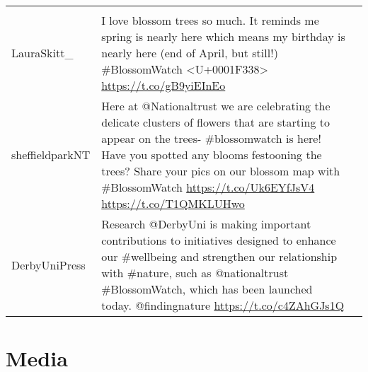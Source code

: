 \documentclass[
]{article}
\begin{document}
\begin{longtable}[]{@{}llr@{}}
\begin{minipage}[t]{0.42\columnwidth}
\end{minipage} & \begin{minipage}[t]{0.18\columnwidth}\raggedleft
2\strut
\end{minipage}\tabularnewline
\begin{minipage}[t]{0.23\columnwidth}\raggedright
LauraSkitt\_\strut
\end{minipage} & \begin{minipage}[t]{0.42\columnwidth}\raggedright
I love blossom trees so much. It reminds me spring is nearly here which
means my birthday is nearly here (end of April, but still!)
\#BlossomWatch \textless U+0001F338\textgreater{}
\url{https://t.co/gB9yiEInEo}\strut
\end{minipage} & \begin{minipage}[t]{0.18\columnwidth}\raggedleft
2\strut
\end{minipage}\tabularnewline
\begin{minipage}[t]{0.23\columnwidth}\raggedright
sheffieldparkNT\strut
\end{minipage} & \begin{minipage}[t]{0.42\columnwidth}\raggedright
Here at @Nationaltrust we are celebrating the delicate clusters of
flowers that are starting to appear on the trees- \#blossomwatch is
here! Have you spotted any blooms festooning the trees? Share your pics
on our blossom map with \#BlossomWatch \url{https://t.co/Uk6EYfJsV4}
\url{https://t.co/T1QMKLUHwo}\strut
\end{minipage} & \begin{minipage}[t]{0.18\columnwidth}\raggedleft
2\strut
\end{minipage}\tabularnewline
\begin{minipage}[t]{0.23\columnwidth}\raggedright
DerbyUniPress\strut
\end{minipage} & \begin{minipage}[t]{0.42\columnwidth}\raggedright
Research @DerbyUni is making important contributions to initiatives
designed to enhance our \#wellbeing and strengthen our relationship with
\#nature, such as @nationaltrust \#BlossomWatch, which has been launched
today. @findingnature \url{https://t.co/c4ZAhGJs1Q}\strut
\end{minipage} & \begin{minipage}[t]{0.18\columnwidth}\raggedleft
2\strut
\end{minipage}\tabularnewline
\bottomrule
\end{longtable}

\hypertarget{media}{%
\section{Media}\label{media}}
\end{document}
